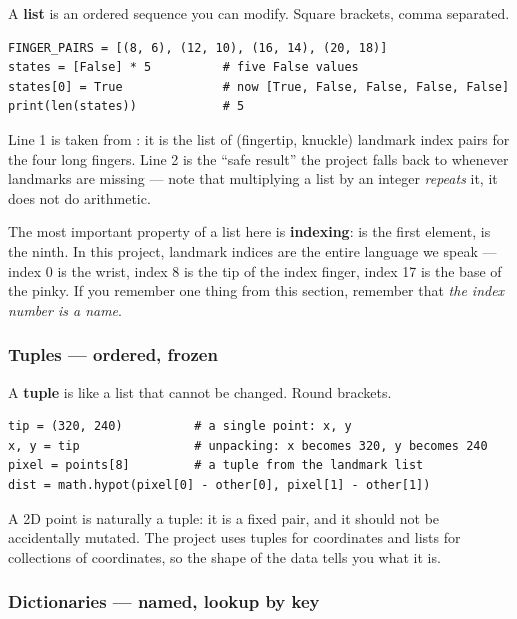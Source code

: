 A \textbf{list} is an ordered sequence you can modify. Square brackets, comma separated.

\begin{codecard}
\begin{lstlisting}
FINGER_PAIRS = [(8, 6), (12, 10), (16, 14), (20, 18)]
states = [False] * 5          # five False values
states[0] = True              # now [True, False, False, False, False]
print(len(states))            # 5
\end{lstlisting}
\end{codecard}

Line 1 is taken from : it is the list of (fingertip, knuckle) landmark index
pairs for the four long fingers. Line 2 is the ``safe result'' the project falls back to whenever
landmarks are missing --- note that multiplying a list by an integer \emph{repeats} it, it does not do
arithmetic.

The most important property of a list here is \textbf{indexing}:  is the first
element,  is the ninth. In this project, landmark indices are the entire language we
speak --- index 0 is the wrist, index 8 is the tip of the index finger, index 17 is the base of the
pinky. If you remember one thing from this section, remember that \emph{the index number is a name}.

\subsubsection*{Tuples --- ordered, frozen}

A \textbf{tuple} is like a list that cannot be changed. Round brackets.

\begin{codecard}
\begin{lstlisting}
tip = (320, 240)          # a single point: x, y
x, y = tip                # unpacking: x becomes 320, y becomes 240
pixel = points[8]         # a tuple from the landmark list
dist = math.hypot(pixel[0] - other[0], pixel[1] - other[1])
\end{lstlisting}
\end{codecard}

A 2D point is naturally a tuple: it is a fixed pair, and it should not be accidentally mutated. The
project uses tuples for coordinates and lists for collections of coordinates, so the shape of the
data tells you what it is.

\subsubsection*{Dictionaries --- named, lookup by key}

